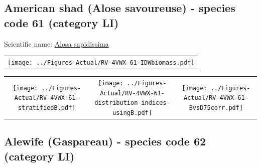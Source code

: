 \documentclass[12pt]{article}\usepackage[]{graphicx}\usepackage[]{color}
\begin{document}
\renewcommand\thefigure{\thesubsection\Alph{figure}}

\setcounter{figure}{0}

\hypertarget{sec:61}{%
\subsection{American shad (Alose savoureuse) - species code 61 (category LI)}\label{sec:61}}

  


Scientific name: \href{http://www.marinespecies.org/aphia.php?p=taxdetails\&id=158670}{Alosa sapidissima} \newline
\begin{minipage}{1.0\textwidth}
 \begin{tabular}{c}
\texttt{[image: ../Figures-Actual/RV-4VWX-61-IDWbiomass.pdf]} \\ 
\end{tabular} 
\end{minipage}
\newline

\vspace{1cm}
\begin{minipage}{1.0\textwidth}
 \begin{tabular}{ccc}
\texttt{[image: ../Figures-Actual/RV-4VWX-61-stratifiedB.pdf]} & 
\texttt{[image: ../Figures-Actual/RV-4VWX-61-distribution-indices-usingB.pdf]} & 
\texttt{[image: ../Figures-Actual/RV-4VWX-61-BvsD75corr.pdf]} \\ 
\end{tabular} 
\end{minipage}
\clearpage

\renewcommand\thefigure{\thesubsection\Alph{figure}}

\setcounter{figure}{0}

\hypertarget{sec:62}{%
\subsection{Alewife (Gaspareau) - species code 62 (category LI)}\label{sec:62}}

  
\end{document}
